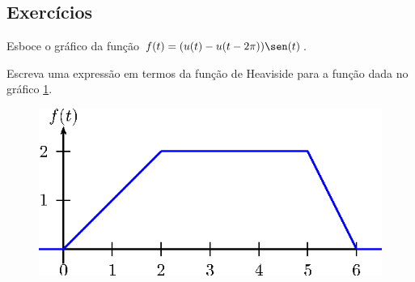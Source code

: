 \subsection*{Exercícios}
\begin{exer}Esboce o gráfico da função $f(t)=(u(t)-u(t-2\pi))\sen(t)$.
\end{exer}
\begin{exer}Escreva uma expressão em termos da função de Heaviside para a função dada no gráfico \ref{fig_Heaviside_prob}.
 \begin{figure}[!ht]
\begin{center}

\includegraphics{cap_trans_int/pics/figura_9}\end{center}
\caption{\label{fig_Heaviside_prob}}
\end{figure}
\end{exer}

